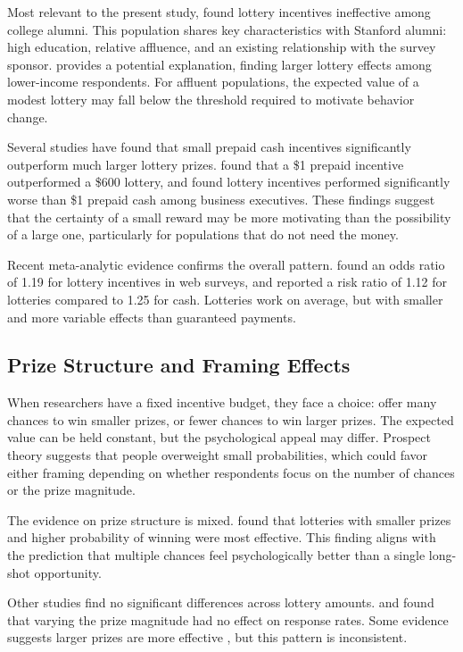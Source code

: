 Most relevant to the present study, \textcite{Denton.Tsai1991} found lottery incentives
ineffective among college alumni. This population shares key characteristics with
Stanford alumni: high education, relative affluence, and an existing relationship with
the survey sponsor. \textcite{Zhang.etal2017a} provides a potential explanation, finding larger
lottery effects among lower-income respondents. For affluent populations, the expected
value of a modest lottery may fall below the threshold required to motivate behavior
change.

Several studies have found that small prepaid cash incentives significantly outperform
much larger lottery prizes. \textcite{Larson.Chow2003} found that a \$1 prepaid incentive
outperformed a \$600 lottery, and \textcite{Lorenzi.etal1988} found lottery incentives
performed significantly worse than \$1 prepaid cash among business executives. These
findings suggest that the certainty of a small reward may be more motivating than the
possibility of a large one, particularly for populations that do not need the money.

Recent meta-analytic evidence confirms the overall pattern. \textcite{Goritz2006a} found
an odds ratio of 1.19 for lottery incentives in web surveys, and
\textcite{Abdelazeem.etal2023} reported a risk ratio of 1.12 for lotteries compared to 1.25
for cash. Lotteries work on average, but with smaller and more variable effects than
guaranteed payments.

\subsection{Prize Structure and Framing Effects}

When researchers have a fixed incentive budget, they face a choice: offer many chances to
win smaller prizes, or fewer chances to win larger prizes. The expected value can be held
constant, but the psychological appeal may differ. Prospect theory suggests that people
overweight small probabilities, which could favor either framing depending on whether
respondents focus on the number of chances or the prize magnitude.

The evidence on prize structure is mixed. \textcite{Deutskens.etal2004} found that lotteries
with smaller prizes and higher probability of winning were most effective. This finding
aligns with the prediction that multiple chances feel psychologically better than a single
long-shot opportunity.

Other studies find no significant differences across lottery amounts.
\textcite{Leung.etal2002} and \textcite{Halpern.etal2011a} found that varying the prize magnitude
had no effect on response rates. Some evidence suggests larger prizes are more effective
\parencite{Hubbard.Little1988, Gajic.etal2012}, but this pattern is inconsistent.

